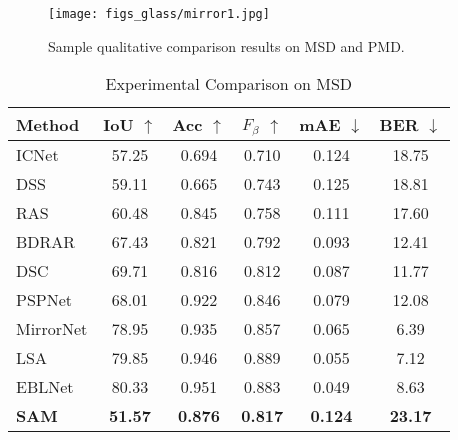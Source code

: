 \documentclass{article}
\begin{document}
\begin{figure*}
\centering
\texttt{[image: figs\_glass/mirror1.jpg]}
\caption{Sample qualitative comparison results on MSD and PMD.}
  \label{mirror1} 
\end{figure*}
\begin{table}%
    \centering
    \begin{tabular}{lccccc} %
    \toprule
    Method & IoU $\uparrow$ & Acc $\uparrow$ &${F}_{\beta}$ $\uparrow$ & mAE $\downarrow$ &BER $\downarrow$ \\
    \midrule
    ICNet \cite{zhao2018icnet}  & 57.25 &0.694&0.710 & 0.124 &18.75\\
    DSS\cite{hou2017deeply}  & 59.11 & 0.665  &0.743  & 0.125 & 18.81\\
    RAS\cite{chen2018reverse}  & 60.48 & 0.845 &0.758     & 0.111 & 17.60\\
    BDRAR\cite{zhu2018bidirectional}  & 67.43 & 0.821 &0.792     & 0.093 & 12.41\\
    DSC\cite{hu2018direction}  & 69.71 & 0.816  &0.812    & 0.087 & 11.77\\
    PSPNet  \cite{zhao2017pyramid} &68.01 &0.922  &0.846  &0.079 &12.08  \\
    MirrorNet\cite{yang2019my}   &78.95 & 0.935 &0.857 & 0.065 & 6.39\\
    LSA \cite{guan2022learning}  &79.85 & 0.946 & 0.889    & 0.055 & 7.12\\
    EBLNet \cite{he2021enhanced}  & 80.33  & 0.951 &0.883    & 0.049 &8.63\\
    \midrule
    \textbf{SAM}  & \textbf{51.57}&\textbf{0.876} &\textbf{0.817}& \textbf{0.124} & \textbf{23.17}\\
    \bottomrule
    \end{tabular}
    \caption{Experimental Comparison on MSD}
        \label{MSD}

\end{table}
\end{document}
